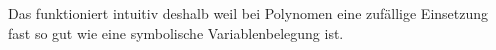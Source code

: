 Das funktioniert intuitiv deshalb weil bei Polynomen eine zufällige Einsetzung
fast so gut wie eine symbolische Variablenbelegung ist.











